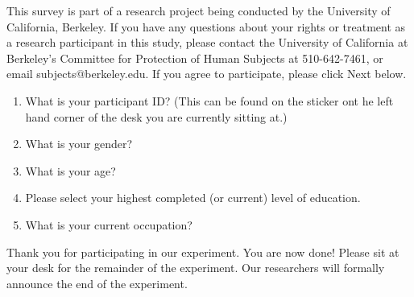 \documentclass{template}
\begin{document}
This survey is part of a research project being conducted by the University of California, Berkeley. If you have any questions about your rights or treatment as a research participant in this study, please contact the University of California at Berkeley's Committee for Protection of Human Subjects at 510-642-7461, or email subjects@berkeley.edu. If you agree to participate, please click Next below.

\begin{enumerate} \itemsep1pt \parskip0pt  
\item{What is your participant ID? (This can be found on the sticker ont he left hand corner of the desk you are currently sitting at.)}
\item{What is your gender?}
\item{What is your age?}
\item{Please select your highest completed (or current) level of education}.
\item{What is your current occupation?}  
\end{enumerate}

Thank you for participating in our experiment. You are now done! Please sit at your desk for the remainder of the experiment. Our researchers will formally announce the end of the experiment. 
\end{document}
